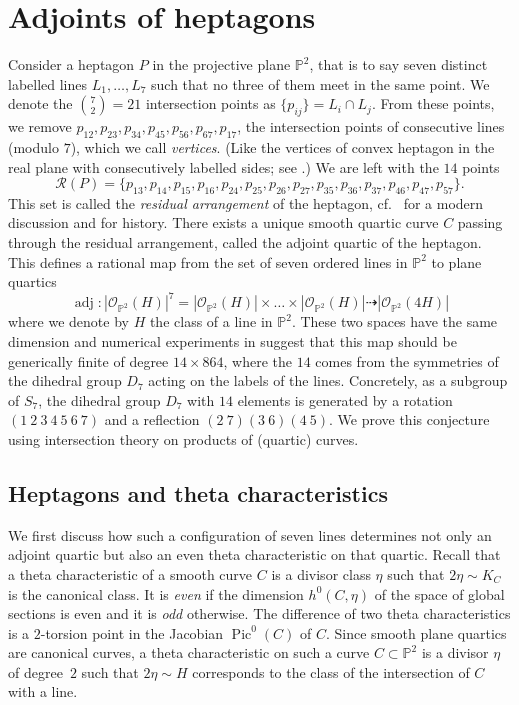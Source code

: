 \documentclass[12pt]{article}
\numberwithin{equation}{section}
\theoremstyle{definition}
\renewcommand{\P}{\mathbb{P}}
\begin{document}
\section{Adjoints of heptagons}\label{sec:adjoints}

Consider a heptagon $P$ in the projective plane $\mathbb{P}^2$, that is to say seven distinct labelled lines $L_1,\dots,L_7$ such that no three of them meet in the same point. We denote the $\binom{7}{2} = 21$ intersection points as $\{p_{ij}\} = L_i\cap L_j$. From these points, we remove $p_{12},p_{23},p_{34},p_{45},p_{56},p_{67},p_{17}$, the intersection points of consecutive lines (modulo $7$), which we call \textit{vertices}. (Like the vertices of convex heptagon in the real plane with consecutively labelled sides; see .) We are left with the $14$ points 
\[ \mathcal{R}(P) = \{p_{13},p_{14},p_{15},p_{16},p_{24},p_{25},p_{26},p_{27},p_{35},p_{36},p_{37},p_{46},p_{47},p_{57} \}. \]
This set is called the \emph{residual arrangement} of the heptagon, cf.~\cite{KRzbMATH07286075} for a modern discussion and \cite{zbMATH06505530} for history.
There exists a unique smooth quartic curve $C$ passing through the residual arrangement, called the adjoint quartic of the heptagon. This defines a rational map from the set of seven ordered lines in $\mathbb{P}^2$ to plane quartics
\begin{equation}\label{eq:mapquartic}
\operatorname{adj}\colon |\mathcal{O}_{\mathbb{P}^2}(H)|^{7} = |\mathcal{O}_{\mathbb{P}^2}(H)| \times \dots \times |\mathcal{O}_{\mathbb{P}^2}(H)| \dashrightarrow |\mathcal{O}_{\mathbb{P}^2}(4H)| 
\end{equation}
where we denote by $H$ the class of a line in $\mathbb{P}^2$. These two spaces have the same dimension and numerical experiments in \cite{polypols} suggest that this map should be generically finite of degree $14\times 864$, where the $14$ comes from the symmetries of the dihedral group $D_7$ acting on the labels of the lines. Concretely, as a subgroup of $S_7$, the dihedral group $D_7$ with $14$ elements is generated by a rotation $(1\ 2\ 3\ 4\ 5\ 6\ 7)$ and a reflection $(2\ 7)(3\ 6) (4\ 5)$.
We prove this conjecture using intersection theory on products of (quartic) curves.

\subsection{Heptagons and theta characteristics}
We first discuss how such a configuration of seven lines determines not only an adjoint quartic but also an even theta characteristic on that quartic. Recall that a theta characteristic of a smooth curve $C$ is a divisor class $\eta$ such that $2\eta \sim K_C$ is the canonical class. It is \textit{even} if the dimension $h^0(C,\eta)$ of the space of global sections is even and it is \emph{odd} otherwise. The difference of two theta characteristics is a $2$-torsion point in the Jacobian $\operatorname{Pic}^0(C)$ of $C$. Since smooth plane quartics are canonical curves, a theta characteristic on such a curve $C\subset \P^2$ is a divisor $\eta$ of degree~$2$ such that $2\eta \sim H$ corresponds to the class of the intersection of $C$ with a line.
\end{document}
